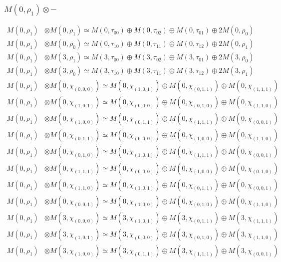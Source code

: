\subsubsection{$ M(0,\rho_{1})\otimes -$}
\begin{align*}
M(0,\rho_{1}) &\otimes M(0,\rho_{1}) \simeq M(0,\tau_{00}) \oplus M(0,\tau_{02}) \oplus M(0,\tau_{01}) \oplus 2 M(0,\rho_{0})\\
M(0,\rho_{1}) &\otimes M(0,\rho_{0}) \simeq M(0,\tau_{10}) \oplus M(0,\tau_{11}) \oplus M(0,\tau_{12}) \oplus 2 M(0,\rho_{1})\\
M(0,\rho_{1}) &\otimes M(3,\rho_{1}) \simeq M(3,\tau_{00}) \oplus M(3,\tau_{02}) \oplus M(3,\tau_{01}) \oplus 2 M(3,\rho_{0})\\
M(0,\rho_{1}) &\otimes M(3,\rho_{0}) \simeq M(3,\tau_{10}) \oplus M(3,\tau_{11}) \oplus M(3,\tau_{12}) \oplus 2 M(3,\rho_{1})\\
M(0,\rho_{1}) &\otimes M(0,\chi_{(0,0,0)}) \simeq M(0,\chi_{(1,0,1)}) \oplus M(0,\chi_{(0,1,1)}) \oplus M(0,\chi_{(1,1,1)})\\
M(0,\rho_{1}) &\otimes M(0,\chi_{(1,0,1)}) \simeq M(0,\chi_{(0,0,0)}) \oplus M(0,\chi_{(0,1,0)}) \oplus M(0,\chi_{(1,1,0)})\\
M(0,\rho_{1}) &\otimes M(0,\chi_{(1,0,0)}) \simeq M(0,\chi_{(0,1,1)}) \oplus M(0,\chi_{(1,1,1)}) \oplus M(0,\chi_{(0,0,1)})\\
M(0,\rho_{1}) &\otimes M(0,\chi_{(0,1,1)}) \simeq M(0,\chi_{(0,0,0)}) \oplus M(0,\chi_{(1,0,0)}) \oplus M(0,\chi_{(1,1,0)})\\
M(0,\rho_{1}) &\otimes M(0,\chi_{(0,1,0)}) \simeq M(0,\chi_{(1,0,1)}) \oplus M(0,\chi_{(1,1,1)}) \oplus M(0,\chi_{(0,0,1)})\\
M(0,\rho_{1}) &\otimes M(0,\chi_{(1,1,1)}) \simeq M(0,\chi_{(0,0,0)}) \oplus M(0,\chi_{(1,0,0)}) \oplus M(0,\chi_{(0,1,0)})\\
M(0,\rho_{1}) &\otimes M(0,\chi_{(1,1,0)}) \simeq M(0,\chi_{(1,0,1)}) \oplus M(0,\chi_{(0,1,1)}) \oplus M(0,\chi_{(0,0,1)})\\
M(0,\rho_{1}) &\otimes M(0,\chi_{(0,0,1)}) \simeq M(0,\chi_{(1,0,0)}) \oplus M(0,\chi_{(0,1,0)}) \oplus M(0,\chi_{(1,1,0)})\\
M(0,\rho_{1}) &\otimes M(3,\chi_{(0,0,0)}) \simeq M(3,\chi_{(1,0,1)}) \oplus M(3,\chi_{(0,1,1)}) \oplus M(3,\chi_{(1,1,1)})\\
M(0,\rho_{1}) &\otimes M(3,\chi_{(1,0,1)}) \simeq M(3,\chi_{(0,0,0)}) \oplus M(3,\chi_{(0,1,0)}) \oplus M(3,\chi_{(1,1,0)})\\
M(0,\rho_{1}) &\otimes M(3,\chi_{(1,0,0)}) \simeq M(3,\chi_{(0,1,1)}) \oplus M(3,\chi_{(1,1,1)}) \oplus M(3,\chi_{(0,0,1)})\\

\end{align*}
